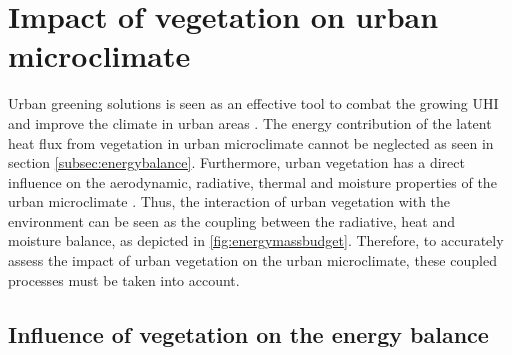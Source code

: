 \section{Impact of vegetation on urban microclimate}

Urban greening solutions is seen as an effective tool to combat the growing UHI and improve the climate in urban areas \citep{Gillner2015, Bowler2010, Loughner2012}.  The energy contribution of the latent heat flux from vegetation in urban microclimate cannot be neglected as seen in section \ref{subsec:energybalance}. Furthermore, urban vegetation has a direct influence on the aerodynamic, radiative, thermal and moisture properties of the urban microclimate \citep{Oke1989}. Thus, the interaction of urban vegetation with the environment can be seen as the coupling between the radiative, heat and moisture balance, as depicted in \cref{fig:energymassbudget}. Therefore, to accurately assess the impact of urban vegetation on the urban microclimate, these coupled processes must be taken into account.
	
\subsection{Influence of vegetation on the energy balance}

